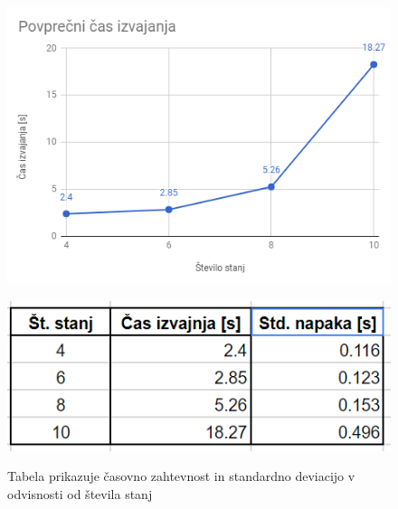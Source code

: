 \documentclass[a4paper,11pt]{article}
\begin{document}
\begin{figure}[htbp]
\begin{center}
\includegraphics[scale=0.8]{graf1.png}
\label{graf}
\end{center}
\end{figure}

\begin{figure}[htbp]
\begin{center}
\includegraphics[scale=0.8]{tabela1.png}
\label{graf}
\caption{Tabela prikazuje časovno zahtevnost in standardno deviacijo v odvisnosti od števila stanj}
\end{center}
\end{figure}
\end{document}
